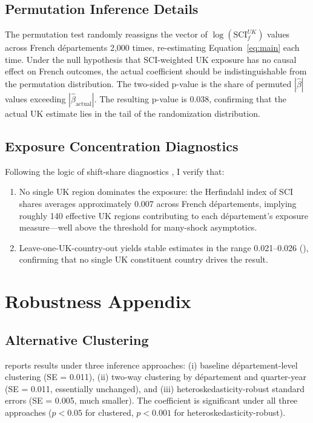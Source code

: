 \documentclass[12pt]{article}
\begin{document}
\subsection{Permutation Inference Details}

The permutation test randomly reassigns the vector of $\log(\text{SCI}_f^{UK})$ values across French d\'epartements 2,000 times, re-estimating Equation~\ref{eq:main} each time. Under the null hypothesis that SCI-weighted UK exposure has no causal effect on French outcomes, the actual coefficient should be indistinguishable from the permutation distribution. The two-sided p-value is the share of permuted $|\hat{\beta}|$ values exceeding $|\hat{\beta}_{\text{actual}}|$. The resulting p-value is 0.038, confirming that the actual UK estimate lies in the tail of the randomization distribution.

\subsection{Exposure Concentration Diagnostics}

Following the logic of shift-share diagnostics \citep{borusyak2022quasi, goldsmith2020bartik}, I verify that:
\begin{enumerate}
\item No single UK region dominates the exposure: the Herfindahl index of SCI shares averages approximately 0.007 across French d\'epartements, implying roughly 140 effective UK regions contributing to each d\'epartement's exposure measure---well above the threshold for many-shock asymptotics.
\item Leave-one-UK-country-out yields stable estimates in the range 0.021--0.026 (), confirming that no single UK constituent country drives the result.
\end{enumerate}

\section{Robustness Appendix}

\subsection{Alternative Clustering}

 reports results under three inference approaches: (i) baseline d\'epartement-level clustering (SE = 0.011), (ii) two-way clustering by d\'epartement and quarter-year (SE = 0.011, essentially unchanged), and (iii) heteroskedasticity-robust standard errors (SE = 0.005, much smaller). The coefficient is significant under all three approaches ($p < 0.05$ for clustered, $p < 0.001$ for heteroskedasticity-robust).
\end{document}
